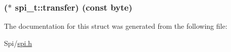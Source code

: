 \subsubsection[{transfer}]{($\ast$ spi\+\_\+t\+::transfer) (const {\bf byte})}\label{structspi__t_a55f7c22f62fbe49b04920f1902102f0c}


The documentation for this struct was generated from the following file\+:\begin{DoxyCompactItemize}
\item 
Spi/\hyperlink{spi_8h}{spi.\+h}\end{DoxyCompactItemize}
